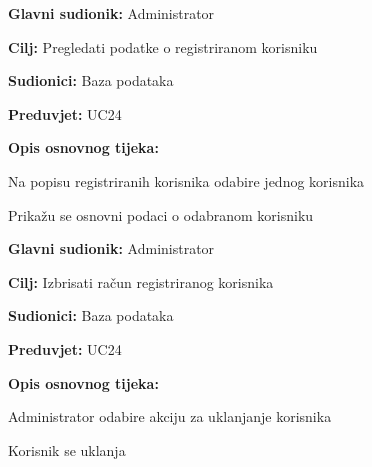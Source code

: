 \noindent {}
\begin{packed_item}
	
	\item \textbf{Glavni sudionik:} Administrator
	\item  \textbf{Cilj:} Pregledati podatke o registriranom korisniku
	\item  \textbf{Sudionici:} Baza podataka
	\item  \textbf{Preduvjet:} UC24
	\item  \textbf{Opis osnovnog tijeka:}
	
	\item[] \begin{packed_enum}

		\item Na popisu registriranih korisnika odabire jednog korisnika
		\item Prikažu se osnovni podaci o odabranom korisniku

	\end{packed_enum}
\end{packed_item}



\pagebreak\noindent {}
\begin{packed_item}
	
	\item \textbf{Glavni sudionik:} Administrator
	\item  \textbf{Cilj:} Izbrisati račun registriranog korisnika
	\item  \textbf{Sudionici:} Baza podataka
	\item  \textbf{Preduvjet:} UC24
	\item  \textbf{Opis osnovnog tijeka:}
	
	\item[] \begin{packed_enum}

		\item Administrator odabire akciju za uklanjanje korisnika
		\item Korisnik se uklanja

	\end{packed_enum}
\end{packed_item}



\pagebreak

